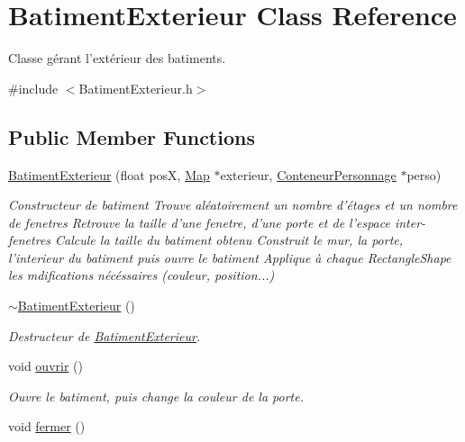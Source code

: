 \hypertarget{classBatimentExterieur}{\section{Batiment\-Exterieur Class Reference}
\label{classBatimentExterieur}
}


Classe gérant l'extérieur des batiments.  




{\ttfamily \#include $<$Batiment\-Exterieur.\-h$>$}

\subsection*{Public Member Functions}
\begin{DoxyCompactItemize}
\item 
\hypertarget{classBatimentExterieur_a59a7496c61c1d0cada8cbf6dc38d26b3}{\hyperlink{classBatimentExterieur_a59a7496c61c1d0cada8cbf6dc38d26b3}{Batiment\-Exterieur} (float pos\-X, \hyperlink{classMap}{Map} $\ast$exterieur, \hyperlink{classConteneurPersonnage}{Conteneur\-Personnage} $\ast$perso)}\label{classBatimentExterieur_a59a7496c61c1d0cada8cbf6dc38d26b3}

\begin{DoxyCompactList}\small\item\em Constructeur de batiment Trouve aléatoirement un nombre d'étages et un nombre de fenetres Retrouve la taille d'une fenetre, d'une porte et de l'espace inter-\/fenetres Calcule la taille du batiment obtenu Construit le mur, la porte, l'interieur du batiment puis ouvre le batiment Applique à chaque Rectangle\-Shape les mdifications nécéssaires (couleur, position...) \end{DoxyCompactList}\item 
\hyperlink{classBatimentExterieur_a37ad20e6c840b9c9008b21508edccda8}{$\sim$\-Batiment\-Exterieur} ()
\begin{DoxyCompactList}\small\item\em Destructeur de \hyperlink{classBatimentExterieur}{Batiment\-Exterieur}. \end{DoxyCompactList}\item 
\hypertarget{classBatimentExterieur_a5ffb4284c583ff39333b8108984d51e4}{void \hyperlink{classBatimentExterieur_a5ffb4284c583ff39333b8108984d51e4}{ouvrir} ()}\label{classBatimentExterieur_a5ffb4284c583ff39333b8108984d51e4}

\begin{DoxyCompactList}\small\item\em Ouvre le batiment, puis change la couleur de la porte. \end{DoxyCompactList}\item 
\hypertarget{classBatimentExterieur_a84948baa08d5ee51e333f5463c65a03b}{void \hyperlink{classBatimentExterieur_a84948baa08d5ee51e333f5463c65a03b}{fermer} ()}\label{classBatimentExterieur_a84948baa08d5ee51e333f5463c65a03b}


\end{DoxyCompactItemize}

